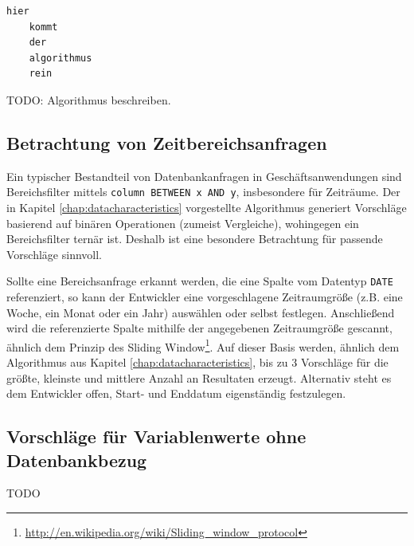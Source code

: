 \begin{lstlisting}[caption={Eingaben von Testwert-Konstellationen erweitern gegebenenfalls das Datenmodell}, label={lst:developerinput}, language=Python]
	hier
	kommt
	der
	algorithmus
	rein
\end{lstlisting}

TODO: Algorithmus beschreiben.

\subsection{Betrachtung von Zeitbereichsanfragen}
Ein typischer Bestandteil von Datenbankanfragen in Geschäftsanwendungen sind Bereichsfilter mittels \texttt{column BETWEEN x AND y},  insbesondere für Zeiträume.
Der in Kapitel \ref{chap:datacharacteristics} vorgestellte Algorithmus generiert Vorschläge basierend auf binären Operationen (zumeist Vergleiche), wohingegen ein Bereichsfilter ternär ist.
Deshalb ist eine besondere Betrachtung für passende Vorschläge sinnvoll.

Sollte eine Bereichsanfrage erkannt werden, die eine Spalte vom Datentyp \texttt{DATE} referenziert, so kann der Entwickler eine vorgeschlagene Zeitraumgröße (z.B. eine Woche, ein Monat oder ein Jahr) auswählen oder selbst festlegen.
Anschließend wird die referenzierte Spalte mithilfe der angegebenen Zeitraumgröße gescannt, ähnlich dem Prinzip des Sliding Window\footnote{\url{http://en.wikipedia.org/wiki/Sliding_window_protocol}}.
Auf dieser Basis werden, ähnlich dem Algorithmus aus Kapitel \ref{chap:datacharacteristics}, bis zu 3 Vorschläge für die größte, kleinste und mittlere Anzahl an Resultaten erzeugt.
Alternativ steht es dem Entwickler offen, Start- und Enddatum eigenständig festzulegen.

\subsection{Vorschläge für Variablenwerte ohne Datenbankbezug}

TODO

